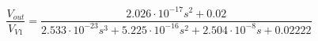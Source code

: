 \begin{equation}
\frac{V_{out}}{V_{V1}} = \frac{2.026 \cdot 10^{-17} s^{2} + 0.02}{2.533 \cdot 10^{-23} s^{3} + 5.225 \cdot 10^{-16} s^{2} + 2.504 \cdot 10^{-8} s + 0.02222}
\end{equation}

